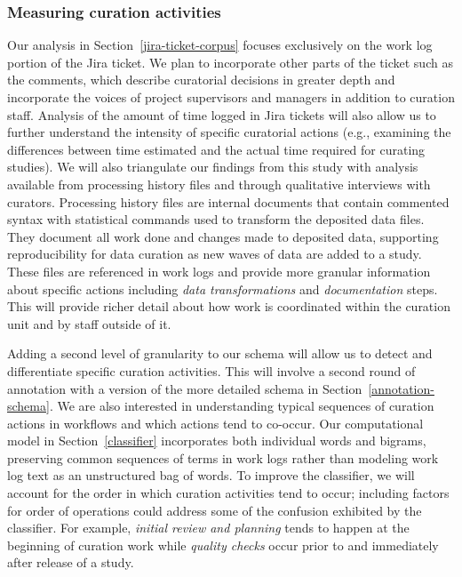 \documentclass[conference]{IEEEtran}
\begin{document}
\subsubsection{Measuring curation activities}
\label{measuring-curation-activities}
Our analysis in Section~\ref{jira-ticket-corpus} focuses exclusively on the work log portion of the Jira ticket. We plan to incorporate other parts of the ticket such as the comments, which describe curatorial decisions in greater depth and incorporate the voices of project supervisors and managers in addition to curation staff. Analysis of the amount of time logged in Jira tickets will also allow us to further understand the intensity of specific curatorial actions (e.g., examining the differences between time estimated and the actual time required for curating studies). We will also triangulate our findings from this study with analysis available from processing history files and through qualitative interviews with curators. Processing history files are internal documents that contain commented syntax with statistical commands used to transform the deposited data files. They document all work done and changes made to deposited data, supporting reproducibility for data curation as new waves of data are added to a study. These files are referenced in work logs and provide more granular information about specific actions including \textit{data transformations} and \textit{documentation} steps. This will provide richer detail about how work is coordinated within the curation unit and by staff outside of it.  

Adding a second level of granularity to our schema will allow us to detect and differentiate specific curation activities. This will involve a second round of annotation with a version of the more detailed schema in Section~\ref{annotation-schema}. We are also interested in understanding typical sequences of curation actions in workflows and which actions tend to co-occur. Our computational model in Section~\ref{classifier} incorporates both individual words and bigrams, preserving common sequences of terms in work logs rather than modeling work log text as an unstructured bag of words. To improve the classifier, we will account for the order in which curation activities tend to occur; including factors for order of operations could address some of the confusion exhibited by the classifier. For example, \textit{initial review and planning} tends to happen at the beginning of curation work while \textit{quality checks} occur prior to and immediately after release of a study.
\end{document}
